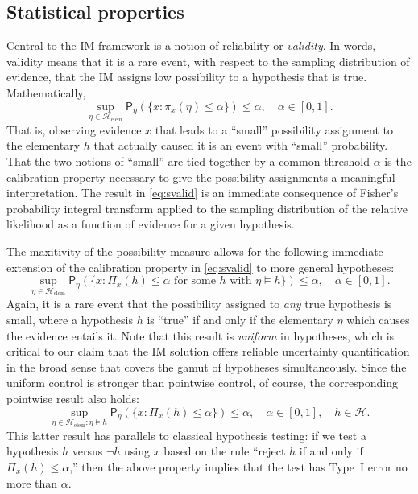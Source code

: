 \documentclass[a4paper, 12pt]{article}
\theoremstyle{plain}
\theoremstyle{definition}
\theoremstyle{remark}
\newcommand{\prob}{\mathsf{P}}
\renewcommand{\H}{\mathcal{H}}
\newcommand{\lPi}{\rotatebox[origin=c]{180}{$\mathsf{\Pi}$}} %
\newcommand{\uPi}{\mathsf{\Pi}}%
\begin{document}
\subsection{Statistical properties}
\label{SS:stat.properties}

Central to the IM framework is a notion of reliability or {\em validity}.  In words, validity means that it is a rare event, with respect to the sampling distribution of evidence, that the IM assigns low possibility to a hypothesis that is true.  Mathematically, 
\begin{equation}
\label{eq:svalid}
\sup_{\eta \in \H_\text{elem}} \prob_\eta(\{x: \pi_x(\eta) \leq \alpha\})
\leq \alpha, \quad \alpha \in [0,1]. 
\end{equation}
That is, observing evidence $x$ that leads to a ``small'' possibility assignment to the elementary $h$ that actually caused it is an event with ``small'' probability.  That the two notions of ``small'' are tied together by a common threshold $\alpha$ is the calibration property necessary to give the possibility assignments a meaningful interpretation.  The result in \eqref{eq:svalid} is an immediate consequence of Fisher's probability integral transform \citep[e.g.,][Theorem~2.1.10]{casella.berger.book} applied to the sampling distribution of the relative likelihood as a function of evidence for a given hypothesis.  

The maxitivity of the possibility measure allows for the following immediate extension of the calibration property in \eqref{eq:svalid} to more general hypotheses:
\begin{equation}
\label{eq:valid}
\sup_{\eta \in \H_\text{elem}} \prob_\eta(\{x: \uPi_x(h) \leq \alpha \text{ for some $h$ with $\eta \models h$}\}) \leq \alpha, \quad
\alpha \in [0,1]. 
\end{equation}
Again, it is a rare event that the possibility assigned to {\em any} true hypothesis is small, where a hypothesis $h$ is ``true'' if and only if the elementary $\eta$ which causes the evidence entails it.  Note that this result is {\em uniform} in hypotheses, which is critical to our claim that the IM solution offers reliable uncertainty quantification in the broad sense that covers the gamut of hypotheses simultaneously.  Since the uniform control is stronger than pointwise control, of course, the corresponding pointwise result also holds:
\[ \sup_{\eta \in \H_\text{elem}: \eta \models h} \prob_\eta(\{x: \uPi_x(h) \leq \alpha\}) \leq \alpha, \quad \alpha \in [0,1], \quad h \in \H. \]
This latter result has parallels to classical hypothesis testing: if we test a hypothesis $h$ versus $\neg h$ using $x$ based on the rule ``reject $h$ if and only if $\uPi_x(h) \leq \alpha$,'' then the above property implies that the test has Type~I error no more than $\alpha$. 
\end{document}
